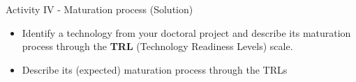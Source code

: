 
\begin{boxB}{Activity IV - Maturation process (Solution)}
    \begin{itemize}
        \item Identify a technology from your doctoral project and describe its maturation process through the \textbf{TRL} (Technology Readiness Levels) scale.
        \item Describe its (expected) maturation process through the TRLs
    \end{itemize}
\end{boxB}



